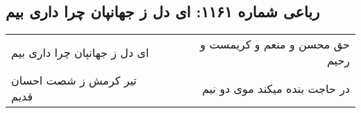 \begin{center}
\section*{رباعی شماره ۱۱۶۱: ای دل ز جهانپان چرا داری بیم}
\label{sec:1161}
\begin{longtable}{l p{0.5cm} r}
ای دل ز جهانپان چرا داری بیم
&&
حق محسن و منعم و کریمست و رحیم
\\
تیر کرمش ز شصت احسان قدیم
&&
در حاجت بنده میکند موی دو نیم
\\
\end{longtable}
\end{center}
